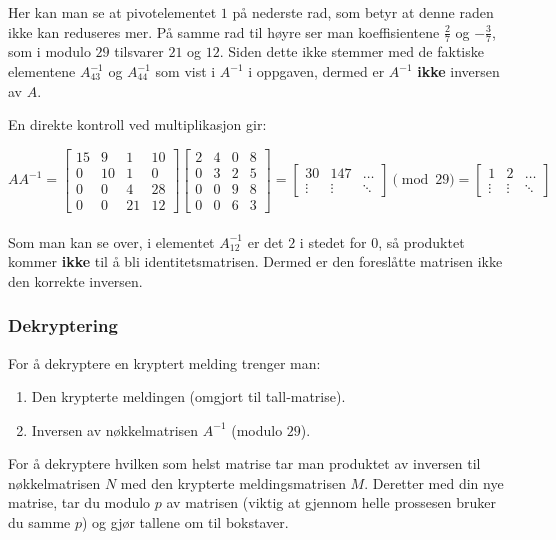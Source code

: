 \documentclass[12pt,a4paper]{article}
\begin{document}
\vspace{4mm}

Her kan man se at pivotelementet $1$ på nederste rad, som betyr at denne raden ikke kan reduseres mer. På samme rad til høyre ser man koeffisientene $\frac{2}{7}$ og $-\frac{3}{7}$, som i modulo $29$ tilsvarer $21$ og $12$. Siden dette ikke stemmer med de faktiske elementene $A^{-1}_{43}$ og $A^{-1}_{44}$ som vist i $A^{-1}$ i oppgaven, dermed er $A^{-1}$ \textbf{ikke} inversen av $A$.

\vspace{2mm}

En direkte kontroll ved multiplikasjon gir:

\vspace{2mm}

\[ AA^{-1}= \begin{bmatrix} 15&9&1&10\\ 0&10&1&0\\ 0&0&4&28\\ 0&0&21&12 \end{bmatrix} \begin{bmatrix} 2&4&0&8\\ 0&3&2&5\\ 0&0&9&8\\ 0&0&6&3 \end{bmatrix} = \begin{bmatrix} 30&147&\dots\\ \vdots & \vdots & \ddots \end{bmatrix} \pmod{29} = \begin{bmatrix} 1&2&\dots\\ \vdots&\vdots&\ddots \end{bmatrix} \] 
\\
Som man kan se over, i elementet $A^{-1}_{12}$ er det $2$ i stedet for $0$, så produktet kommer \textbf{ikke} til å bli identitetsmatrisen. Dermed er den foreslåtte matrisen ikke den korrekte inversen.

\subsubsection*{Dekryptering}
For å dekryptere en kryptert melding trenger man:
\begin{enumerate}
\item Den krypterte meldingen (omgjort til tall‑matrise).
\item Inversen av nøkkelmatrisen $A^{-1}$ (modulo $29$).
\end{enumerate}
For å dekryptere hvilken som helst matrise tar man produktet av inversen til nøkkelmatrisen $N$ med den krypterte meldingsmatrisen $M$.  Deretter med din nye matrise, tar du modulo $p$ av matrisen (viktig at gjennom helle prossesen bruker du samme $p$) og gjør tallene om til bokstaver.
\end{document}
